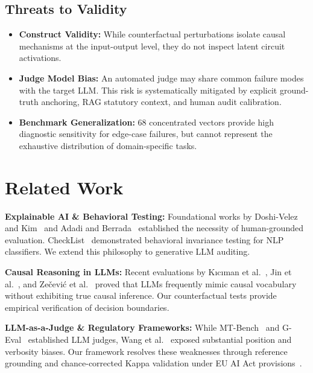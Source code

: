 \documentclass[conference]{IEEEtran}
\begin{document}
\subsection{Threats to Validity}
\begin{itemize}
    \item \textbf{Construct Validity:} While counterfactual perturbations isolate causal mechanisms at the input-output level, they do not inspect latent circuit activations.
    \item \textbf{Judge Model Bias:} An automated judge may share common failure modes with the target LLM. This risk is systematically mitigated by explicit ground-truth anchoring, RAG statutory context, and human audit calibration.
    \item \textbf{Benchmark Generalization:} 68 concentrated vectors provide high diagnostic sensitivity for edge-case failures, but cannot represent the exhaustive distribution of domain-specific tasks.
\end{itemize}

\section{Related Work}
\label{sec:related_work}

\textbf{Explainable AI \& Behavioral Testing:} Foundational works by Doshi-Velez and Kim~\cite{doshivelez2017towards} and Adadi and Berrada~\cite{adadi2018peeking} established the necessity of human-grounded evaluation. CheckList~\cite{ribeiro2020checklist} demonstrated behavioral invariance testing for NLP classifiers. We extend this philosophy to generative LLM auditing.

\textbf{Causal Reasoning in LLMs:} Recent evaluations by K{\i}c{\i}man et al.~\cite{kiciman2023causal}, Jin et al.~\cite{jin2024corr2cause}, and Ze{\v{c}}evi{\'c} et al.~\cite{zecevic2023causal} proved that LLMs frequently mimic causal vocabulary without exhibiting true causal inference. Our counterfactual tests provide empirical verification of decision boundaries.

\textbf{LLM-as-a-Judge \& Regulatory Frameworks:} While MT-Bench~\cite{zheng2023judging} and G-Eval~\cite{liu2023geval} established LLM judges, Wang et al.~\cite{wang2024large} exposed substantial position and verbosity biases. Our framework resolves these weaknesses through reference grounding and chance-corrected Kappa validation under EU AI Act provisions~\cite{eu2024ai-act, veale2021demystifying, hacker2023regulating}.
\end{document}
